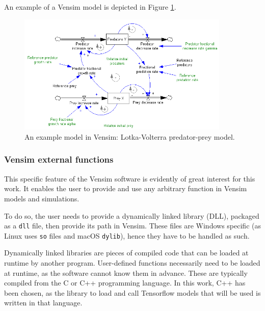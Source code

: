 An example of a Vensim model is depicted in Figure \ref{fig:vensim-model-example}.

\begin{figure}[h!]
    \includegraphics[width=0.9\textwidth]{resources/images/vensim-model-example.png}
    \caption{An example model in Vensim: Lotka-Volterra predator-prey model.}
    \label{fig:vensim-model-example}
\end{figure}

\subsubsection{Vensim external functions}

This specific feature of the Vensim software is evidently of great interest for this work. It enables the user to provide and use any arbitrary function in Vensim models and simulations.

To do so, the user needs to provide a dynamically linked library (DLL), packaged as a \texttt{dll} file, then provide its path in Vensim. These files are Windows specific (as Linux uses \texttt{so} files and macOS \texttt{dylib}), hence they have to be handled as such.

Dynamically linked libraries are pieces of compiled code that can be loaded at runtime by another program. User-defined functions necessarily need to be loaded at runtime, as the software cannot know them in advance. These are typically compiled from the C or C++ programming language. In this work, C++ has been chosen, as the library to load and call Tensorflow models that will be used is written in that language.


